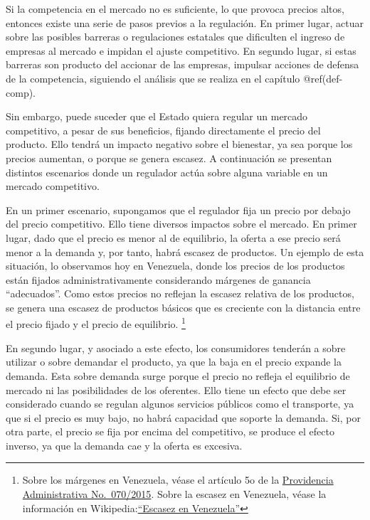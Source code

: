\documentclass[
  12pt,
  spanish,
]{book}
\begin{document}
Si la competencia en el mercado no es suficiente, lo que provoca precios
altos, entonces existe una serie de pasos previos a la regulación. En
primer lugar, actuar sobre las posibles barreras o regulaciones
estatales que dificulten el ingreso de empresas al mercado e impidan el
ajuste competitivo. En segundo lugar, si estas barreras son producto del
accionar de las empresas, impulsar acciones de defensa de la
competencia, siguiendo el análisis que se realiza en el capítulo
@ref(def-comp).

Sin embargo, puede suceder que el Estado quiera regular un mercado
competitivo, a pesar de sus beneficios, fijando directamente el precio
del producto. Ello tendrá un impacto negativo sobre el bienestar, ya sea
porque los precios aumentan, o porque se genera escasez. A continuación
se presentan distintos escenarios donde un regulador actúa sobre alguna
variable en un mercado competitivo.

En un primer escenario, supongamos que el regulador fija un precio por
debajo del precio competitivo. Ello tiene diversos impactos sobre el
mercado. En primer lugar, dado que el precio es menor al de equilibrio,
la oferta a ese precio será menor a la demanda y, por tanto, habrá
escasez de productos. Un ejemplo de esta situación, lo observamos hoy en
Venezuela, donde los precios de los productos están fijados
administrativamente considerando márgenes de ganancia ``adecuados''.
Como estos precios no reflejan la escasez relativa de los productos, se
genera una escasez de productos básicos que es creciente con la
distancia entre el precio fijado y el precio de equilibrio. \footnote{Sobre
  los márgenes en Venezuela, véase el artículo 5o de la
  \href{http://www.superintendenciadepreciosjustos.gob.ve/sites/default/files/PROVIDENCIA\%20070-2015.pdf}{Providencia
  Administrativa No.~070/2015}. Sobre la escasez en Venezuela, véase la
  información en
  Wikipedia:\href{https://es.wikipedia.org/wiki/Escasez_en_Venezuela}{``Escasez
  en Venezuela''}}

En segundo lugar, y asociado a este efecto, los consumidores tenderán a
sobre utilizar o sobre demandar el producto, ya que la baja en el precio
expande la demanda. Esta sobre demanda surge porque el precio no refleja
el equilibrio de mercado ni las posibilidades de los oferentes. Ello
tiene un efecto que debe ser considerado cuando se regulan algunos
servicios públicos como el transporte, ya que si el precio es muy bajo,
no habrá capacidad que soporte la demanda. Si, por otra parte, el precio
se fija por encima del competitivo, se produce el efecto inverso, ya que
la demanda cae y la oferta es excesiva.
\end{document}

